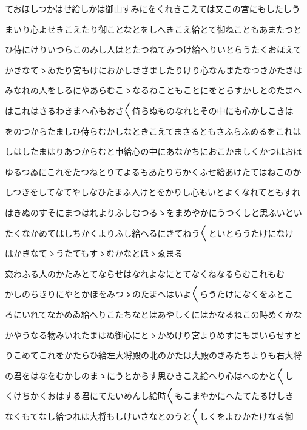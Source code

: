 \documentclass[a4paper,11pt,landscape]{ltjtarticle}
\begin{document}
\par\medskip
ておほしつかはせ給しかは御山すみにをくれきこえては又この宮にもしたしう
\par\medskip
まいり心よせきこえたり御ことなとをしへきこえ給とて御ねこともあまたつと
\par\medskip
ひ侍にけりいつらこのみし人はとたつねてみつけ給へりいとらうたくおほえて
\par\medskip
かきなてゝゐたり宮もけにおかしきさましたりけり心なんまたなつきかたきは
\par\medskip
みなれぬ人をしるにやあらむこゝなるねこともことにをとらすかしとのたまへ
\par\medskip
はこれはさるわきまへ心もおさ〱侍らぬものなれとその中にも心かしこきは
\par\medskip
をのつからたましひ侍らむかしなときこえてまさるともさふらふめるをこれは
\par\medskip
しはしたまはりあつからむと申給心の中にあなかちにおこかましくかつはおほ
\par\medskip
ゆるつゐにこれをたつねとりてよるもあたりちかくふせ給あけたてはねこのか
\par\medskip
しつきをしてなてやしなひたまふ人けとをかりし心もいとよくなれてともすれ
\par\medskip
はきぬのすそにまつはれよりふしむつるゝをまめやかにうつくしと思ふいとい
\par\medskip
たくなかめてはしちかくよりふし給へるにきてねう〱といとらうたけになけ
\par\medskip
はかきなてゝうたてもすゝむかなとほゝゑまる
\par\medskip
恋わふる人のかたみとてならせはなれよなにとてなくねなるらむこれもむ
\par\medskip
かしのちきりにやとかほをみつゝのたまへはいよ〱らうたけになくをふとこ
\par\medskip
ろにいれてなかめゐ給へりこたちなとはあやしくにはかなるねこの時めくかな
\par\medskip
かやうなる物みいれたまはぬ御心にとゝかめけり宮よりめすにもまいらせすと
\par\medskip
りこめてこれをかたらひ給左大将殿の北のかたは大殿のきみたちよりも右大将
\par\medskip
の君をはなをむかしのまゝにうとからす思ひきこえ給へり心はへのかと〱し
\par\medskip
くけちかくおはする君にてたいめんし給時〱もこまやかにへたてたるけしき
\par\medskip
なくもてなし給つれは大将もしけいさなとのうと〱しくをよひかたけなる御
\par\medskip
\end{document}
